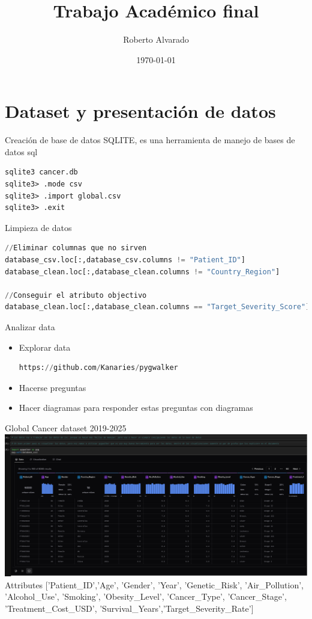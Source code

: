 \documentclass{beamer}
\title{Trabajo Académico final}
\date{\today}
\author{Roberto Alvarado}
\institute{UTPL}
\begin{document}
  \maketitle
  \section{Dataset y presentación de datos}
  \begin{frame}[fragile]{Creación de base de datos}
      SQLITE, es una herramienta de manejo de bases de datos sql
\begin{lstlisting}
sqlite3 cancer.db
sqlite3> .mode csv
sqlite3> .import global.csv
sqlite3> .exit
\end{lstlisting}
    \end{frame}
    \begin{frame}[fragile]{Limpieza de datos}
        \scriptsize
    \begin{lstlisting}[language=Python]
//Eliminar columnas que no sirven
database_csv.loc[:,database_csv.columns != "Patient_ID"]
database_clean.loc[:,database_clean.columns != "Country_Region"]

//Conseguir el atributo objectivo
database_clean.loc[:,database_clean.columns == "Target_Severity_Score"]
    \end{lstlisting}
    \end{frame}
    \begin{frame}[fragile]{Analizar data}
        \scriptsize
    \begin{itemize}
        \item Explorar data
            \begin{lstlisting}[language=Python]
https://github.com/Kanaries/pygwalker
            \end{lstlisting}
        \item Hacerse preguntas
        \item Hacer diagramas para responder estas preguntas con diagramas
    \end{itemize}
    \end{frame}
  \begin{frame}{Global Cancer dataset 2019-2025}
      \center
      \includegraphics[width=\textwidth]{../figures/img0.png}
      Attributes ['Patient\_ID','Age', 'Gender', 'Year', 'Genetic\_Risk', 'Air\_Pollution', 'Alcohol\_Use',
      'Smoking', 'Obesity\_Level', 'Cancer\_Type', 'Cancer\_Stage',
      'Treatment\_Cost\_USD', 'Survival\_Years','Target\_Severity\_Rate']
  \end{frame}
\end{document}
